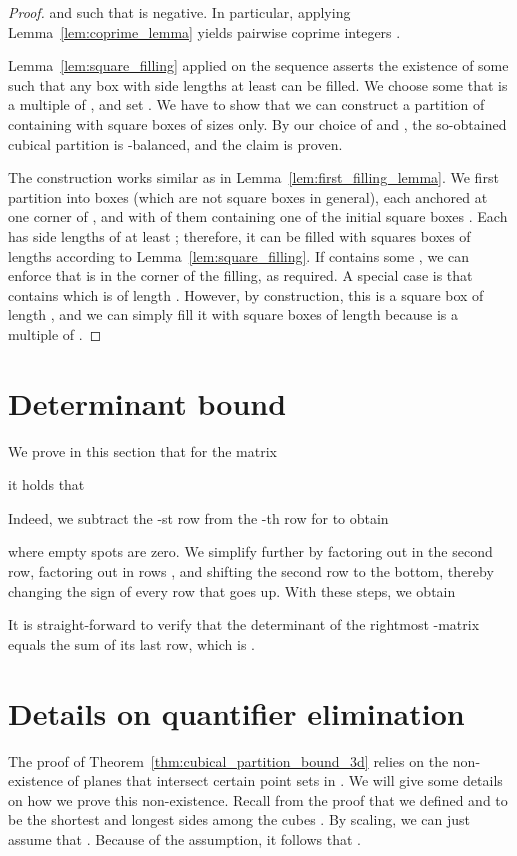 \documentclass[12pt]{article}
\begin{document}
\begin{appendix}
\begin{proof}
\noindent and such that  is negative.
In particular, applying Lemma~\ref{lem:coprime_lemma} yields  pairwise coprime integers
.

Lemma~\ref{lem:square_filling} applied on the sequence  
asserts the existence of some  such that any box with side lengths at least 
can be filled. We choose some  that is a multiple of ,
and set . We have to show that we can construct a partition of  
containing 
with square boxes of sizes  only. 
By our choice of  and , the so-obtained cubical
partition is -balanced, and the claim is proven.

The construction works similar as
in Lemma~\ref{lem:first_filling_lemma}.
We first partition 
into  boxes  
(which are not square boxes in general), each anchored at one corner of ,
and with  of them containing one of the initial square boxes .
Each  has side lengths of at least ; therefore,
it can be filled with squares boxes of lengths  according to
Lemma~\ref{lem:square_filling}. If 
 contains some , we can enforce that  is in the corner
of the filling, as required. A special case is that 
contains  which is of length . However, by construction,
this  is a square box of length , and we can simply fill
it with square boxes of length  because  is a multiple of .
\end{proof}


\section{Determinant bound}
\label{app:determinant}

We prove in this section that for the  matrix

it holds that 


Indeed, we subtract the -st row from the -th row for  to obtain

where empty spots are zero.
We simplify further by 
factoring out  in the second row,
factoring out  in rows ,
and shifting the second row to the bottom, thereby changing the sign
of every row that goes up. With these steps, we obtain

It is straight-forward to verify that the determinant of the rightmost -matrix
equals the sum of its last row, which is .

\section{Details on quantifier elimination}
\label{app:qe}
The proof of Theorem~\ref{thm:cubical_partition_bound_3d} relies on the 
non-existence of planes that intersect certain point sets in .
We will give some details on how we prove this non-existence.
Recall from the proof that
we defined  and  to be the shortest and longest sides among the cubes .
By scaling, we can just assume that . Because of the assumption, it
follows that . 


\end{appendix}
\end{document}
